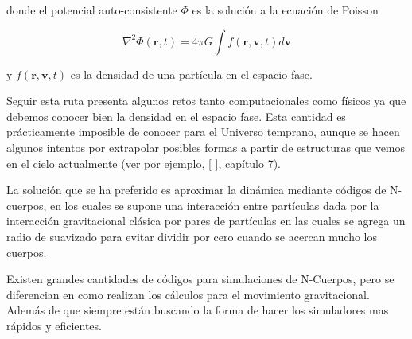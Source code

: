 \noindent donde el potencial auto-consistente $\Phi$ es la solución a la ecuación de Poisson

\begin{equation}
    \nabla^2\Phi(\mathbf{r},t) = 4\pi G \int f(\mathbf{r},\mathbf{v},t)d\mathbf{v}
    \label{eq:PoissonSol}
\end{equation}

\noindent y $f(\mathbf{r},\mathbf{v},t)$ es la densidad de una partícula en el espacio fase.





Seguir esta ruta presenta algunos retos tanto computacionales como físicos ya que debemos conocer bien la densidad en el espacio fase. Esta cantidad es prácticamente imposible de conocer para el Universo temprano, aunque se hacen algunos intentos por extrapolar posibles formas a partir de estructuras que vemos en el cielo actualmente (ver por ejemplo, [\cite[Binney]{Binney1988-rs} ], capítulo 7). 

La solución que se ha preferido es aproximar la dinámica mediante códigos de N-cuerpos, en los cuales se supone una interacción entre partículas dada por la interacción gravitacional clásica por pares de partículas en las cuales se agrega un radio de suavizado para evitar dividir por cero cuando se acercan mucho los cuerpos. 

Existen grandes cantidades de códigos para simulaciones de N-Cuerpos, pero se diferencian en como realizan los cálculos para el movimiento gravitacional. Además de que siempre están buscando la forma de hacer los simuladores mas rápidos y eficientes.

